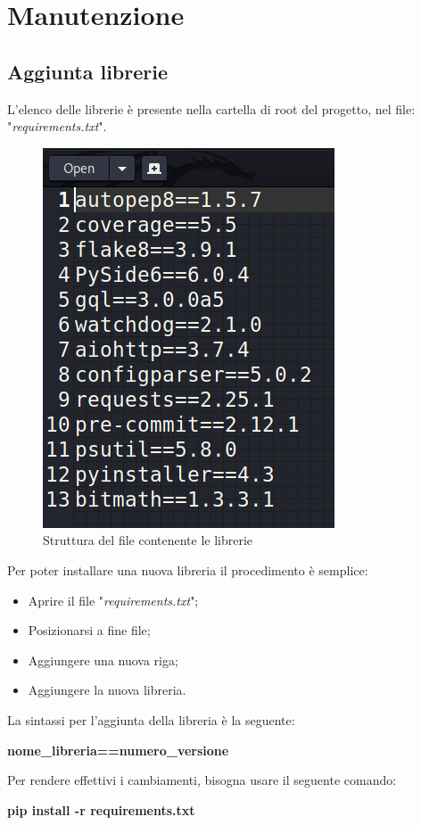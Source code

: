 \section{Manutenzione}

\subsection{Aggiunta librerie}
L'elenco delle librerie è presente nella cartella di root del progetto, nel file: "\textit{requirements.txt}".

\begin{figure}[H]
    \centering
    \includegraphics[scale = 0.5]{components/img/requirements.png}
    \caption{Struttura del file contenente le librerie}
    \label{fig:Struttura del file contentente le librerie}
\end{figure}
Per poter installare una nuova libreria il procedimento è semplice:
\begin{itemize}
    \item Aprire il file "\textit{requirements.txt}";
    \item Posizionarsi a fine file;
    \item Aggiungere una nuova riga;
    \item Aggiungere la nuova libreria.
\end{itemize}
La sintassi per l'aggiunta della libreria è la seguente:
\newline{} \centerline{\textbf{nome\_libreria==numero\_versione}}\newline{}
Per rendere effettivi i cambiamenti, bisogna usare il seguente comando:
\newline{}\centerline{\textbf{pip install -r requirements.txt}}\newline{}

